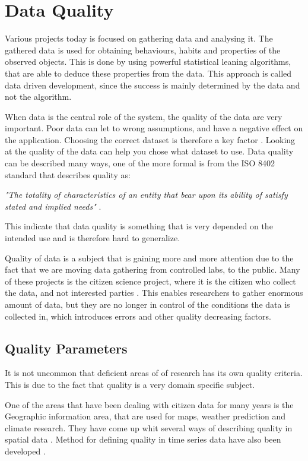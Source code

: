 \chapter{Data Quality}
Various projects today is focused on gathering data and analysing it. The gathered data is used for obtaining behaviours, habits and properties of the observed objects. This is done by using powerful statistical leaning algorithms, that are able to deduce these properties from the data. This approach is called data driven development, since the success is mainly determined by the data and not the algorithm. 

When data is the central role of the system, the quality of the data are very important. Poor data can let to wrong assumptions, and have a negative effect on the application. Choosing the correct dataset is therefore a key factor \cite{RefWorks:3}. Looking at the quality of the data can help you chose what dataset to use. Data quality can be described many ways, one of the more formal is from the ISO 8402 standard that describes quality as: 

\begin{adjustwidth}{2.5em}{2.5em}
\emph{"The totality of characteristics of an entity that bear upon its ability of satisfy stated and implied needs"} \cite{RefWorks:5}.
\end{adjustwidth}

This indicate that data quality is something that is very depended on the intended use and is therefore hard to generalize. 

Quality of data is a subject that is gaining more and more attention due to the fact that we are moving data gathering from controlled labs, to the public. Many of these projects is the citizen science project, where it is the citizen who collect the data, and not interested parties \cite{RefWorks:2}. This enables researchers to gather enormous amount of data, but they are no longer in control of the conditions the data is collected in, which introduces errors and other quality decreasing factors. 


\section{Quality Parameters}
It is not uncommon that deficient areas of of research has its own quality criteria. This is due to the fact that quality is a very domain specific subject.

One of the areas that have been dealing with citizen data for many years is the Geographic information area, that are used for maps, weather prediction and climate research. They have come up whit several ways of describing quality in spatial data \cite{RefWorks:7}. Method for defining quality in time series data have also been developed  \cite{RefWorks:6}. 

